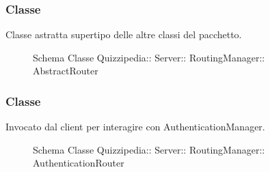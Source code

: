 \subsubsection{Classe }
Classe astratta supertipo delle altre classi del pacchetto.
\begin{figure}[H]
\centering
\noindent{}
\caption[Schema Classe AbstractRouter]{Schema Classe Quizzipedia:: Server:: RoutingManager:: AbstractRouter}
\end{figure}
\subsubsection{Classe }
Invocato dal client per interagire con AuthenticationManager.
\begin{figure}[H]
\centering
\noindent{}
\caption[Schema Classe AuthenticationRouter]{Schema Classe Quizzipedia:: Server:: RoutingManager:: AuthenticationRouter}
\end{figure}

